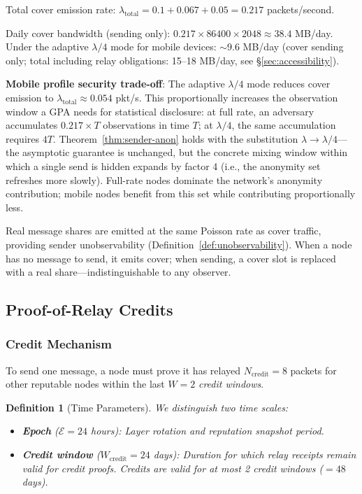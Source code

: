 \documentclass[11pt,a4paper]{article}
\newtheorem{definition}{Definition}
\begin{document}
Total cover emission rate: $\lambda_{\text{total}} = 0.1 + 0.067 + 0.05 = 0.217$ packets/second.

Daily cover bandwidth (sending only): $0.217 \times 86400 \times 2048 \approx 38.4$ MB/day. Under the adaptive $\lambda/4$ mode for mobile devices: $\sim$9.6 MB/day (cover sending only; total including relay obligations: 15--18 MB/day, see \S\ref{sec:accessibility}).

\textbf{Mobile profile security trade-off}: The adaptive $\lambda/4$ mode reduces cover emission to $\lambda_{\text{total}} \approx 0.054$ pkt/s. This proportionally increases the observation window a GPA needs for statistical disclosure: at full rate, an adversary accumulates $0.217 \times T$ observations in time $T$; at $\lambda/4$, the same accumulation requires $4T$. Theorem~\ref{thm:sender-anon} holds with the substitution $\lambda \to \lambda/4$---the asymptotic guarantee is unchanged, but the concrete mixing window within which a single send is hidden expands by factor 4 (i.e., the anonymity set refreshes more slowly). Full-rate nodes dominate the network's anonymity contribution; mobile nodes benefit from this set while contributing proportionally less.

Real message shares are emitted at the same Poisson rate as cover traffic, providing sender unobservability (Definition~\ref{def:unobservability}). When a node has no message to send, it emits cover; when sending, a cover slot is replaced with a real share---indistinguishable to any observer.

\subsection{Proof-of-Relay Credits}
\label{sec:credits}

\subsubsection{Credit Mechanism}

To send one message, a node must prove it has relayed $N_{\text{credit}} = 8$ packets for other reputable nodes within the last $W = 2$ \emph{credit windows}.

\begin{definition}[Time Parameters]
\label{def:time-params}
We distinguish two time scales:
\begin{itemize}[nosep]
    \item \textbf{Epoch} ($\mathcal{E} = 24$ hours): Layer rotation and reputation snapshot period.
    \item \textbf{Credit window} ($W_{\text{credit}} = 24$ days): Duration for which relay receipts remain valid for credit proofs. Credits are valid for at most 2 credit windows ($= 48$ days).
\end{itemize}
\end{definition}
\end{document}
